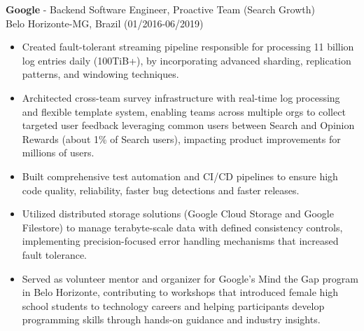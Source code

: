 
\normalsize{\textbf{Google} - Backend Software Engineer, Proactive Team (Search Growth)}\\
    \footnotesize{Belo Horizonte-MG, Brazil (01/2016-06/2019)}
    
\begin{itemize}
    \item \small{Created fault-tolerant streaming pipeline responsible for processing 11 billion
        log entries daily (100TiB+), by incorporating advanced sharding, replication patterns, and
        windowing techniques.}

    \item \small{Architected cross-team survey infrastructure with real-time log processing and flexible 
        template system, enabling teams across multiple orgs to collect targeted user feedback 
        leveraging common users between Search and Opinion Rewards (about 1\% of Search users),
        impacting product improvements for millions of users.}


    \item \small{Built comprehensive test automation and CI/CD pipelines to ensure high code 
        quality, reliability, faster bug detections and faster releases.}

    \item \small{Utilized distributed storage solutions (Google Cloud Storage and Google
        Filestore) to manage terabyte-scale data with defined consistency controls, implementing
        precision-focused error handling mechanisms that increased fault tolerance.}

    \item \small{Served as volunteer mentor and organizer for Google's Mind the Gap program 
        in Belo Horizonte, contributing to workshops that introduced female high school students to 
        technology careers and helping participants develop programming skills through hands-on 
        guidance and industry insights.}
\end{itemize}